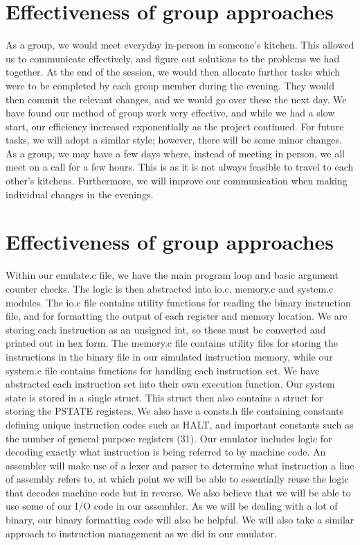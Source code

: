 \documentclass[11pt]{article}
\begin{document}
\section{Effectiveness of group approaches}

As a group, we would meet everyday in-person in someone’s kitchen. This allowed us to communicate
effectively, and figure out solutions to the problems we had together. At the end of the session, we
would then allocate further tasks which were to be completed by each group member during the
evening. They would then commit the relevant changes, and we would go over these the next day.
We have found our method of group work very effective, and while we had a slow start, our
efficiency increased exponentially as the project continued. For future tasks, we will adopt a similar
style; however, there will be some minor changes. As a group, we may have a few days where,
instead of meeting in person, we all meet on a call for a few hours. This is as it is not always
feasible to travel to each other’s kitchens. Furthermore, we will improve our communication when
making individual changes in the evenings.

\section{Effectiveness of group approaches}
Within our emulate.c file, we have the main program loop and basic argument counter checks. The
logic is then abstracted into io.c, memory.c and system.c modules. The io.c file contains utility
functions for reading the binary instruction file, and for formatting the output of each register and
memory location. We are storing each instruction as an unsigned int, so these must be converted
and printed out in hex form. The memory.c file contains utility files for storing the instructions
in the binary file in our simulated instruction memory, while our system.c file contains functions
for handling each instruction set. We have abstracted each instruction set into their own execution
function.
Our system state is stored in a single struct. This struct then also contains a struct for storing
the PSTATE registers. We also have a consts.h file containing constants defining unique instruction
codes such as HALT, and important constants such as the number of general purpose registers (31).
Our emulator includes logic for decoding exactly what instruction is being referred to by machine
code. An assembler will make use of a lexer and parser to determine what instruction a line
of assembly refers to, at which point we will be able to essentially reuse the logic that decodes
machine code but in reverse. We also believe that we will be able to use some of our I/O code in
our assembler. As we will be dealing with a lot of binary, our binary formatting code will also be
helpful. We will also take a similar approach to instruction management as we did in our emulator.
\end{document}
